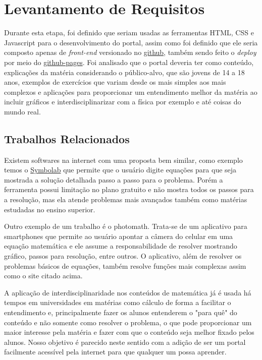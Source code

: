 \documentclass[12pt]{report}
\begin{document}
\chapter{Levantamento de Requisitos}
Durante esta etapa, foi definido que seriam usadas as ferramentas HTML, CSS e Javascript para o desenvolvimento do portal, assim como foi definido que ele seria composto apenas de \textit{front-end} versionado no \href{https://github.com/Pedenite/PILC-eq}{github}, também sendo feito o \textit{deploy} por meio do \href{https://pedenite.github.io/PILC-eq/}{github-pages}. Foi analisado que o portal deveria ter como conteúdo, explicações da matéria considerando o público-alvo, que são jovens de 14 a 18 anos, exemplos de exercícios que variam desde os mais simples aos mais complexos e aplicações para proporcionar um entendimento melhor da matéria ao incluir gráficos e interdisciplinarizar com a física por exemplo e até coisas do mundo real.

\section{Trabalhos Relacionados}
Existem softwares na internet com uma proposta bem similar, como exemplo temos o \href{https://pt.symbolab.com/}{Symbolab} que permite que o usuário digite equações para que seja mostrada a solução detalhada passo a passo para o problema. Porém a ferramenta possui limitação no plano gratuito e não mostra todos os passos para a resolução, mas ela atende problemas mais avançados também como matérias estudadas no ensino superior.

Outro exemplo de um trabalho é o photomath. Trata-se de um aplicativo para smartphones que permite ao usuário apontar a câmera do celular em uma equação matemática e ele assume a responsabilidade de resolver mostrando gráfico, passos para resolução, entre outros. O aplicativo, além de resolver os problemas básicos de equações, também resolve funções mais complexas assim como o site citado acima.

A aplicação de interdisciplinaridade nos conteúdos de matemática já é usada há tempos em universidades em matérias como cálculo de forma a facilitar o entendimento e, principalmente fazer os alunos entenderem o "para quê" do conteúdo e não somente como resolver o problema, o que pode proporcionar um maior interesse pela matéria e fazer com que o conteúdo seja melhor fixado pelos alunos. Nosso objetivo é parecido neste sentido com a adição de ser um portal facilmente acessível pela internet para que qualquer um possa aprender.
\end{document}
